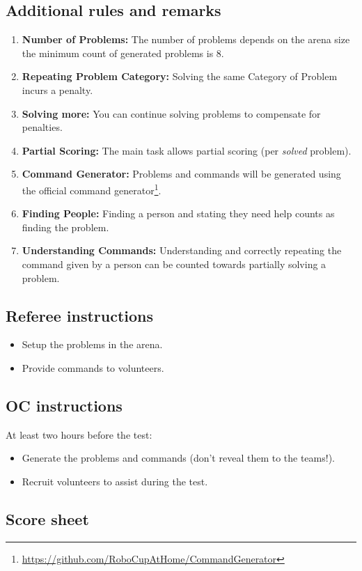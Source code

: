 \subsection*{Additional rules and remarks}
\begin{enumerate}[nosep]
	\item \textbf{Number of Problems:} The number of problems depends on the arena size the minimum count of generated problems is 8.
	\item \textbf{Repeating Problem Category:} Solving the same Category of Problem incurs a penalty. 
	\item \textbf{Solving more:} You can continue solving problems to compensate for penalties.
	\item \textbf{Partial Scoring:} The main task allows partial scoring (per \emph{solved} problem).
	\item \textbf{Command Generator:} Problems and commands will be generated using the official command generator\footnote{\url{https://github.com/RoboCupAtHome/CommandGenerator}}.
	\item \textbf{Finding People:} Finding a person and stating they need help counts as finding the problem.
	\item \textbf{Understanding Commands:} Understanding and correctly repeating the command given by a person can be counted towards partially solving a problem.
\end{enumerate}

\subsection*{Referee instructions}
\begin{itemize}
	\item Setup the problems in the arena.
	\item Provide commands to volunteers.
\end{itemize}

\subsection*{OC instructions}

At least two hours before the test:
\begin{itemize}
	\item Generate the problems and commands (don't reveal them to the teams!).
	\item Recruit volunteers to assist during the test.
\end{itemize}


\subsection*{Score sheet}


